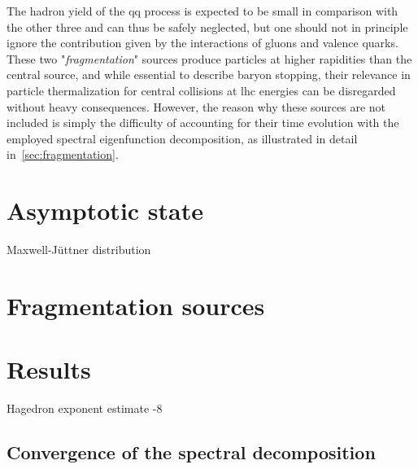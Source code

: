 \documentclass[a4paper,12pt]{book}
\begin{document}
The hadron yield of the qq process is expected to be small in comparison with the other three and can thus be safely neglected, but one should not in principle ignore the contribution given by the interactions of gluons and valence quarks. These two "\textit{fragmentation}" sources produce particles at higher rapidities than the central source, and while essential to describe baryon stopping, their relevance in particle thermalization for central collisions at \acrshort{lhc} energies can be disregarded without heavy consequences. However, the reason why these sources are not included is simply the difficulty of accounting for their time evolution with the employed spectral eigenfunction decomposition, as illustrated in detail in~\autoref{sec:fragmentation}. 




\section{Asymptotic state}

Maxwell-Jüttner distribution~\parencite{Juttner1911}

\section{Fragmentation sources}\label{sec:fragmentation}



\section{Results}
Hagedron exponent estimate -8 ~\parencite{Phenix2011}~\parencite{aamodt_production_2011}~\parencite{MICHAEL19791}

\subsection{Convergence of the spectral decomposition}
\end{document}
